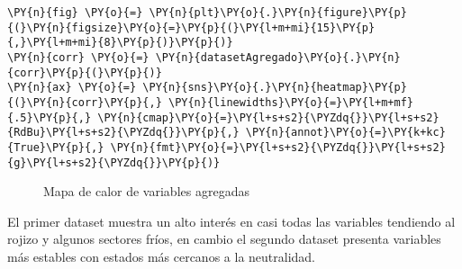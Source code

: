     
    \begin{tcolorbox}[breakable, size=fbox, boxrule=1pt, pad at break*=1mm,colback=cellbackground, colframe=cellborder]
\begin{Verbatim}[commandchars=\\\{\}]
\PY{n}{fig} \PY{o}{=} \PY{n}{plt}\PY{o}{.}\PY{n}{figure}\PY{p}{(}\PY{n}{figsize}\PY{o}{=}\PY{p}{(}\PY{l+m+mi}{15}\PY{p}{,}\PY{l+m+mi}{8}\PY{p}{)}\PY{p}{)}
\PY{n}{corr} \PY{o}{=} \PY{n}{datasetAgregado}\PY{o}{.}\PY{n}{corr}\PY{p}{(}\PY{p}{)}
\PY{n}{ax} \PY{o}{=} \PY{n}{sns}\PY{o}{.}\PY{n}{heatmap}\PY{p}{(}\PY{n}{corr}\PY{p}{,} \PY{n}{linewidths}\PY{o}{=}\PY{l+m+mf}{.5}\PY{p}{,} \PY{n}{cmap}\PY{o}{=}\PY{l+s+s2}{\PYZdq{}}\PY{l+s+s2}{RdBu}\PY{l+s+s2}{\PYZdq{}}\PY{p}{,} \PY{n}{annot}\PY{o}{=}\PY{k+kc}{True}\PY{p}{,} \PY{n}{fmt}\PY{o}{=}\PY{l+s+s2}{\PYZdq{}}\PY{l+s+s2}{g}\PY{l+s+s2}{\PYZdq{}}\PY{p}{)}
\end{Verbatim}
\end{tcolorbox}

    \begin{center}
    	\begin{figure}[H]
    	 \centering
    	\caption{Mapa de calor de variables agregadas}
	\label{fig:mcva}
	\end{figure}
\end{center}
    
    El primer dataset muestra un alto interés en casi todas las variables
tendiendo al rojizo y algunos sectores fríos, en cambio el segundo
dataset presenta variables más estables con estados más cercanos a la
neutralidad.
